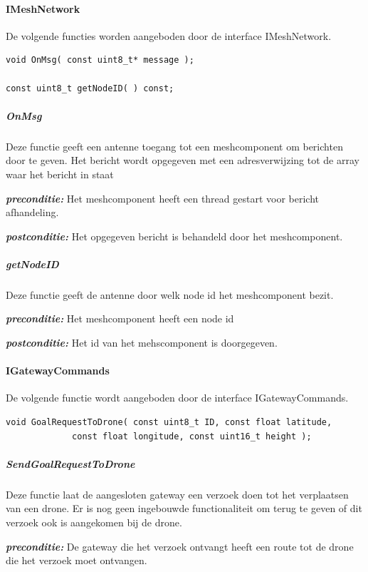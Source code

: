 \documentclass[a4paper, 11pt, oneside]{report}
\begin{document}
\paragraph{IMeshNetwork}
\label{DetailedDesign:CommunicatieComponentDiagram:interface:IMeshnetwork}
De volgende functies worden aangeboden door de interface IMeshNetwork. 

\begin{lstlisting}
void OnMsg( const uint8_t* message );

const uint8_t getNodeID( ) const;
\end{lstlisting}

\subparagraph{OnMsg}
Deze functie geeft een antenne toegang tot een meshcomponent om berichten door te geven. Het bericht wordt opgegeven met een adresverwijzing tot de array waar het bericht in staat

\textbf{\textit{preconditie:}} Het meshcomponent heeft een thread gestart voor bericht afhandeling.

\textbf{\textit{postconditie:}} Het opgegeven bericht is behandeld door het meshcomponent.

\subparagraph{getNodeID}
Deze functie geeft de antenne door welk node id het meshcomponent bezit.

\textbf{\textit{preconditie:}} Het meshcomponent heeft een node id

\textbf{\textit{postconditie:}} Het id van het mehscomponent is doorgegeven.

\paragraph{IGatewayCommands }
\label{DetailedDesign:CommunicatieComponentDiagram:interface:IGatewayCommands}
De volgende functie wordt aangeboden door de interface IGatewayCommands. 

\begin{lstlisting}
void GoalRequestToDrone( const uint8_t ID, const float latitude,
			 const float longitude, const uint16_t height );
\end{lstlisting}

\subparagraph{SendGoalRequestToDrone}
Deze functie laat de aangesloten gateway een verzoek doen tot het verplaatsen van een drone. Er is nog geen ingebouwde functionaliteit om terug te geven of dit verzoek ook is aangekomen bij de drone. 

\textbf{\textit{preconditie:}} De gateway die het verzoek ontvangt heeft een route tot de drone die het verzoek moet ontvangen. 
\end{document}
